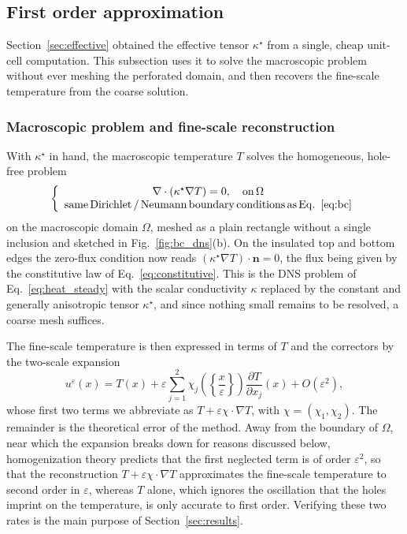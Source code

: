 \documentclass{article}
\makeatletter
\providecommand\FloatBarrier{\par\begingroup\let\@elt\relax
  \edef\@tempa{\@botlist\@deferlist\@dbldeferlist}%
  \ifx\@tempa\@empty\else\clearpage\fi\endgroup}
\newcommand{\tmop}[1]{\ensuremath{\operatorname{#1}}}
\makeatother
\begin{document}
\FloatBarrier
\subsection{First order approximation}

Section~\ref{sec:effective} obtained the effective tensor $\kappa^{\star}$ from a
single, cheap unit-cell computation. This subsection uses it to solve the
macroscopic problem without ever meshing the perforated domain, and then
recovers the fine-scale temperature from the coarse solution.

\FloatBarrier
\subsubsection{Macroscopic problem and fine-scale reconstruction}
\label{sec:reconstruction}

With $\kappa^{\star}$ in hand, the macroscopic temperature $T$ solves the
homogeneous, hole-free problem
\begin{equation}
  \label{eq:macro_problem}
  \left\{ \begin{array}{c}
    \nabla \cdot \left( \kappa^{\star} \nabla T \right) = 0, \quad \tmop{on}
    \Omega \\
    \tmop{same} \tmop{Dirichlet}/\tmop{Neumann} \tmop{boundary} \tmop{conditions}
    \tmop{as} \tmop{Eq.}~\eqref{eq:bc}
  \end{array} \right.
\end{equation}
on the macroscopic domain $\Omega$, meshed as a plain rectangle without a
single inclusion and sketched in Fig.~\ref{fig:bc_dns}(b). On the insulated top and
bottom edges the zero-flux condition now reads $(\kappa^{\star}\nabla T)\cdot\mathbf{n}=0$,
the flux being given by the constitutive law of Eq.~\eqref{eq:constitutive}. This is the DNS problem of Eq.~\eqref{eq:heat_steady}
with the scalar conductivity $\kappa$ replaced by the constant and generally
anisotropic tensor $\kappa^{\star}$, and since nothing small remains to be
resolved, a coarse mesh suffices.

The fine-scale temperature is then expressed in terms of $T$ and the
correctors by the two-scale expansion
\begin{equation}
  \label{eq:twoscale_ansatz}
  u^{\varepsilon} (x) = T (x) + \varepsilon \sum_{j = 1}^2 \chi_j \left( \left\{
  \frac{x}{\varepsilon} \right\} \right) \frac{\partial T}{\partial x_j} (x) + O
  (\varepsilon^2),
\end{equation}
whose first two terms we abbreviate as $T + \varepsilon \chi \cdot \nabla T$, with
$\chi = (\chi_1, \chi_2)$. The remainder is the theoretical error of the method.
Away from the boundary of $\Omega$, near which the expansion breaks down for
reasons discussed below, homogenization theory predicts that the
first neglected term is of order $\varepsilon^2$, so that the reconstruction
$T + \varepsilon \chi \cdot \nabla T$ approximates the fine-scale temperature to
second order in $\varepsilon$, whereas $T$ alone, which ignores the oscillation
that the holes imprint on the temperature, is only accurate to first order.
Verifying these two rates is the main purpose of Section~\ref{sec:results}.
\end{document}
